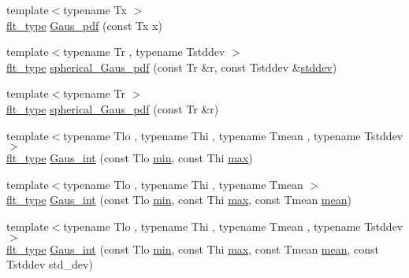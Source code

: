 \begin{DoxyCompactItemize}
\item 
{\footnotesize template$<$typename Tx $>$ }\\\hyperlink{lib_2IceBRG__main_2common_8h_ad0f130a56eeb944d9ef2692ee881ecc4}{flt\+\_\+type} \hyperlink{namespaceIceBRG_a50467489e498f200633a8b6a61463128}{Gaus\+\_\+pdf} (const Tx x)
\item 
{\footnotesize template$<$typename Tr , typename Tstddev $>$ }\\\hyperlink{lib_2IceBRG__main_2common_8h_ad0f130a56eeb944d9ef2692ee881ecc4}{flt\+\_\+type} \hyperlink{namespaceIceBRG_a86dea37686c1770a3a8aaab374cc3687}{spherical\+\_\+\+Gaus\+\_\+pdf} (const Tr \&r, const Tstddev \&\hyperlink{namespaceIceBRG_a9db49a32658ae04d4e5780e90c58ae15}{stddev})
\item 
{\footnotesize template$<$typename Tr $>$ }\\\hyperlink{lib_2IceBRG__main_2common_8h_ad0f130a56eeb944d9ef2692ee881ecc4}{flt\+\_\+type} \hyperlink{namespaceIceBRG_a4f04b3480baf1f252d04f7f1c4777a7d}{spherical\+\_\+\+Gaus\+\_\+pdf} (const Tr \&r)
\item 
{\footnotesize template$<$typename Tlo , typename Thi , typename Tmean , typename Tstddev $>$ }\\\hyperlink{lib_2IceBRG__main_2common_8h_ad0f130a56eeb944d9ef2692ee881ecc4}{flt\+\_\+type} \hyperlink{namespaceIceBRG_a22ce04cc01b33b6d2b6de4125456bd34}{Gaus\+\_\+int} (const Tlo \hyperlink{namespaceIceBRG_aa6b6fb2d7875bb865ebaf20c5c9cbc85}{min}, const Thi \hyperlink{namespaceIceBRG_af8123f867f9a8c6a9703da8556182c84}{max})
\item 
{\footnotesize template$<$typename Tlo , typename Thi , typename Tmean $>$ }\\\hyperlink{lib_2IceBRG__main_2common_8h_ad0f130a56eeb944d9ef2692ee881ecc4}{flt\+\_\+type} \hyperlink{namespaceIceBRG_a2056e0efcbeb941094f619adebc2a375}{Gaus\+\_\+int} (const Tlo \hyperlink{namespaceIceBRG_aa6b6fb2d7875bb865ebaf20c5c9cbc85}{min}, const Thi \hyperlink{namespaceIceBRG_af8123f867f9a8c6a9703da8556182c84}{max}, const Tmean \hyperlink{namespaceIceBRG_a31912d66a78938bcc3e0fdbc917c5eec}{mean})
\item 
{\footnotesize template$<$typename Tlo , typename Thi , typename Tmean , typename Tstddev $>$ }\\\hyperlink{lib_2IceBRG__main_2common_8h_ad0f130a56eeb944d9ef2692ee881ecc4}{flt\+\_\+type} \hyperlink{namespaceIceBRG_ace47a01b4a92f314bca2201efd67ede9}{Gaus\+\_\+int} (const Tlo \hyperlink{namespaceIceBRG_aa6b6fb2d7875bb865ebaf20c5c9cbc85}{min}, const Thi \hyperlink{namespaceIceBRG_af8123f867f9a8c6a9703da8556182c84}{max}, const Tmean \hyperlink{namespaceIceBRG_a31912d66a78938bcc3e0fdbc917c5eec}{mean}, const Tstddev std\+\_\+dev)

\end{DoxyCompactItemize}
